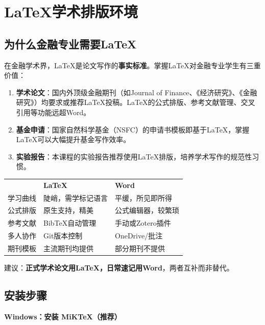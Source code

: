 \section{LaTeX学术排版环境}

\subsection{为什么金融专业需要LaTeX}

在金融学术界，LaTeX是论文写作的\textbf{事实标准}。掌握LaTeX对金融专业学生有三重价值：

\begin{enumerate}[leftmargin=2em]
  \item \textbf{学术论文}：国内外顶级金融期刊（如Journal of Finance、《经济研究》、《金融研究》）均要求或推荐LaTeX投稿。LaTeX的公式排版、参考文献管理、交叉引用等功能远超Word。
  \item \textbf{基金申请}：国家自然科学基金（NSFC）的申请书模板即基于LaTeX，掌握LaTeX可以大幅提升基金写作效率。
  \item \textbf{实验报告}：本课程的实验报告推荐使用LaTeX排版，培养学术写作的规范性习惯。
\end{enumerate}

\begin{theorybox}
\begin{tabular}{lll}
 & \textbf{LaTeX} & \textbf{Word} \\
学习曲线 & 陡峭，需学标记语言 & 平缓，所见即所得 \\
公式排版 & 原生支持，精美 & 公式编辑器，较繁琐 \\
参考文献 & BibTeX自动管理 & 手动或Zotero插件 \\
多人协作 & Git版本控制 & OneDrive/批注 \\
期刊模板 & 主流期刊均提供 & 部分期刊不提供 \\
\end{tabular}

建议：\textbf{正式学术论文用LaTeX，日常速记用Word}，两者互补而非替代。
\end{theorybox}

\subsection{安装步骤}

\textbf{Windows：安装 MiKTeX（推荐）}

